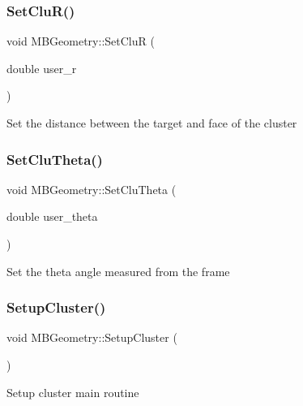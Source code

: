 \subsubsection{\texorpdfstring{Set\+Clu\+R()}{SetCluR()}}
{\footnotesize\ttfamily void M\+B\+Geometry\+::\+Set\+CluR (\begin{DoxyParamCaption}\item[{double}]{user\+\_\+r }\end{DoxyParamCaption})}

Set the distance between the target and face of the cluster \mbox{\label{class_m_b_geometry_a9a2a8c9609141be92d7ba30e6087aa30}} 
\subsubsection{\texorpdfstring{Set\+Clu\+Theta()}{SetCluTheta()}}
{\footnotesize\ttfamily void M\+B\+Geometry\+::\+Set\+Clu\+Theta (\begin{DoxyParamCaption}\item[{double}]{user\+\_\+theta }\end{DoxyParamCaption})}

Set the theta angle measured from the frame \mbox{\label{class_m_b_geometry_a4d98a38f0dc1ca6a4a73477dde5cdd8d}} 
\subsubsection{\texorpdfstring{Setup\+Cluster()}{SetupCluster()}\hspace{0.1cm}{\footnotesize\ttfamily [1/2]}}
{\footnotesize\ttfamily void M\+B\+Geometry\+::\+Setup\+Cluster (\begin{DoxyParamCaption}{ }\end{DoxyParamCaption})}

Setup cluster main routine \mbox{\label{class_m_b_geometry_a93f157cebad3f63dbbefb5b08f3555af}} 
